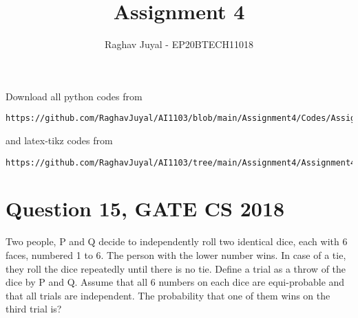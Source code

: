 \documentclass[journal,12pt,twocolumn]{IEEEtran}
\begin{document}
\let\vec\mathbf
\renewcommand{\thefigure}{\theproblem}
\def\putbox#1#2#3{\makebox[0in][l]{\makebox[#1][l]{}\raisebox{\baselineskip}[0in][0in]{\raisebox{#2}[0in][0in]{#3}}}}
     \def\rightbox#1{\makebox[0in][r]{#1}}
     \def\centbox#1{\makebox[0in]{#1}}
     \def\topbox#1{\raisebox{-\baselineskip}[0in][0in]{#1}}
     \def\midbox#1{\raisebox{-0.5\baselineskip}[0in][0in]{#1}}
\vspace{3cm}
\title{Assignment 4}
\author{Raghav Juyal - EP20BTECH11018}
\maketitle
\newpage
\bigskip
\renewcommand{\thefigure}{\theenumi}
\renewcommand{\thetable}{\theenumi}
Download all python codes from 
\begin{lstlisting}
https://github.com/RaghavJuyal/AI1103/blob/main/Assignment4/Codes/Assignment4.py
\end{lstlisting}
%
and latex-tikz codes from 
%
\begin{lstlisting}
https://github.com/RaghavJuyal/AI1103/tree/main/Assignment4/Assignment4.tex
\end{lstlisting}
\section*{Question 15, GATE CS 2018}
Two people, P and Q decide to independently roll two identical dice, each with 6 faces, numbered 1 to 6. The person with the lower number wins. In case of a tie, they roll the dice repeatedly until there is no tie. Define a trial as a throw of the dice by P and Q. Assume that all 6 numbers on each dice are equi-probable and that all trials are independent. The probability that one of them wins on the third trial is?
\end{document}
